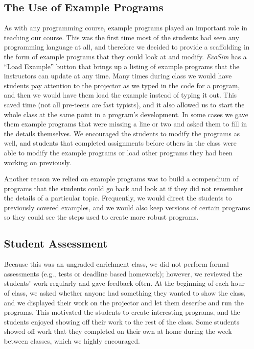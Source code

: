 \documentclass{sig-alternate}
\begin{document}
\subsection{The Use of Example Programs}
As with any programming course, example programs played an important role in teaching our course.
This was the first time most of the students had seen any programming language at all, and
therefore we decided to provide a scaffolding in the form of example programs that they could
look at and modify.  \emph{EcoSim} has a ``Load Example'' button that brings up a listing of
example programs that the instructors can update at any time.  Many times during class we would
have students pay attention to the projector as we typed in the code for a program, and then we
would have them load the example instead of typing it out.  This saved time (not all pre-teens
are fast typists), and it also allowed us to start the whole class at the same point in a program's
development.  In some cases we gave them example programs that were missing a line or two and
asked them to fill in the details themselves.  We encouraged the students to modify the programs
as well, and students that completed assignments before others in the class were able to modify
the example programs or load other programs they had been working on previously.

Another reason we relied on example programs was to build a compendium of programs that the students
could go back and look at if they did not remember the details of a particular topic.  Frequently,
we would direct the students to previously covered examples, and we would also keep versions of 
certain programs so they could see the steps used to create more robust programs.

\subsection{Student Assessment}
Because this was an ungraded enrichment class, we did not perform formal assessments (e.g., tests
or deadline based homework); however, we reviewed the students' work regularly and gave feedback
often.  At the beginning of each hour of class, we asked whether anyone had something they wanted
to show the class, and we displayed their work on the projector and let them describe and run the
programs.  This motivated the students to create interesting programs, and the students enjoyed
showing off their work to the rest of the class.  Some students showed off work that they completed
on their own at home during the week between classes, which we highly encouraged.
\end{document}
